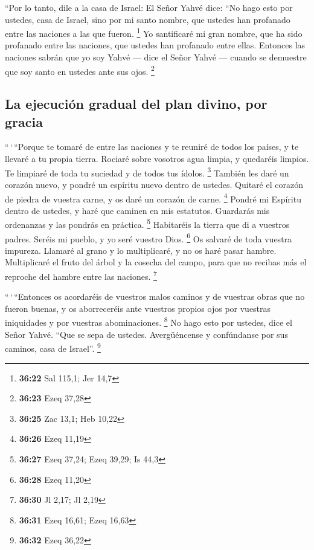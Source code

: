  ``Por lo tanto, dile a la casa de Israel: El Señor Yahvé
dice: ``No hago esto por ustedes, casa de Israel, sino por mi santo
nombre, que ustedes han profanado entre las naciones a las que fueron.
\footnote{\textbf{36:22} Sal 115,1; Jer 14,7}  Yo
santificaré mi gran nombre, que ha sido profanado entre las naciones,
que ustedes han profanado entre ellas. Entonces las naciones sabrán que
yo soy Yahvé --- dice el Señor Yahvé --- cuando se demuestre que soy
santo en ustedes ante sus ojos. \footnote{\textbf{36:23} Ezeq 37,28}

\hypertarget{la-ejecuciuxf3n-gradual-del-plan-divino-por-gracia}{%
\subsection{La ejecución gradual del plan divino, por
gracia}\label{la-ejecuciuxf3n-gradual-del-plan-divino-por-gracia}}

 ``\,`\,``Porque te tomaré de entre las naciones y te
reuniré de todos los países, y te llevaré a tu propia tierra.
 Rociaré sobre vosotros agua limpia, y quedaréis limpios.
Te limpiaré de toda tu suciedad y de todos tus ídolos. \footnote{\textbf{36:25}
  Zac 13,1; Heb 10,22}  También les daré un corazón
nuevo, y pondré un espíritu nuevo dentro de ustedes. Quitaré el corazón
de piedra de vuestra carne, y os daré un corazón de carne. \footnote{\textbf{36:26}
  Ezeq 11,19}  Pondré mi Espíritu dentro de ustedes, y
haré que caminen en mis estatutos. Guardarás mis ordenanzas y las
pondrás en práctica. \footnote{\textbf{36:27} Ezeq 37,24; Ezeq 39,29; Is
  44,3}  Habitaréis la tierra que di a vuestros padres.
Seréis mi pueblo, y yo seré vuestro Dios. \footnote{\textbf{36:28} Ezeq
  11,20}  Os salvaré de toda vuestra impureza. Llamaré al
grano y lo multiplicaré, y no os haré pasar hambre. 
Multiplicaré el fruto del árbol y la cosecha del campo, para que no
recibas más el reproche del hambre entre las naciones. \footnote{\textbf{36:30}
  Jl 2,17; Jl 2,19}

 ``\,`\,``Entonces os acordaréis de vuestros malos
caminos y de vuestras obras que no fueron buenas, y os aborreceréis ante
vuestros propios ojos por vuestras iniquidades y por vuestras
abominaciones. \footnote{\textbf{36:31} Ezeq 16,61; Ezeq 16,63}
 No hago esto por ustedes, dice el Señor Yahvé. ``Que se
sepa de ustedes. Avergüéncense y confúndanse por sus caminos, casa de
Israel''. \footnote{\textbf{36:32} Ezeq 36,22}

